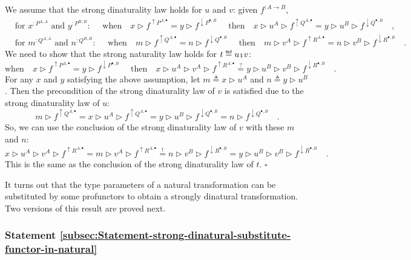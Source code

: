 We assume that the strong dinaturality law holds for $u$ and $v$:
given $f^{:A\rightarrow B}$,
\begin{align*}
 & \text{for }x^{:P^{A,A}}\text{ and }y^{:P^{B,B}}:\quad\text{ when}\quad x\triangleright f^{\uparrow P^{A,\bullet}}=y\triangleright f^{\downarrow P^{\bullet,B}}\quad\text{ then}\quad x\triangleright u^{A}\triangleright f^{\uparrow Q^{A,\bullet}}=y\triangleright u^{B}\triangleright f^{\downarrow Q^{\bullet,B}}\quad,\\
 & \text{for }m^{:Q^{A,A}}\text{ and }n^{:Q^{B,B}}:\quad\text{ when}\quad m\triangleright f^{\uparrow Q^{A,\bullet}}=n\triangleright f^{\downarrow Q^{\bullet,B}}\quad\text{ then}\quad m\triangleright v^{A}\triangleright f^{\uparrow R^{A,\bullet}}=n\triangleright v^{B}\triangleright f^{\downarrow R^{\bullet,B}}\quad.
\end{align*}
We need to show that the strong naturality law holds for $t\triangleq u\bef v$:
\[
\text{when}\quad x\triangleright f^{\uparrow P^{A,\bullet}}=y\triangleright f^{\downarrow P^{\bullet,B}}\quad\text{ then}\quad x\triangleright u^{A}\triangleright v^{A}\triangleright f^{\uparrow R^{A,\bullet}}\overset{?}{=}y\triangleright u^{B}\triangleright v^{B}\triangleright f^{\downarrow R^{\bullet,B}}\quad.
\]
For any $x$ and $y$ satisfying the above assumption, let $m\triangleq x\triangleright u^{A}$
and $n\triangleq y\triangleright u^{B}$. Then the precondition of
the strong dinaturality law of $v$ is satisfied due to the strong
dinaturality law of $u$:
\[
m\triangleright f^{\uparrow Q^{A,\bullet}}=x\triangleright u^{A}\triangleright f^{\uparrow Q^{A,\bullet}}=y\triangleright u^{B}\triangleright f^{\downarrow Q^{\bullet,B}}=n\triangleright f^{\downarrow Q^{\bullet,B}}\quad.
\]
So, we can use the conclusion of the strong dinaturality law of $v$
with these $m$ and $n$:
\[
x\triangleright u^{A}\triangleright v^{A}\triangleright f^{\uparrow R^{A,\bullet}}=m\triangleright v^{A}\triangleright f^{\uparrow R^{A,\bullet}}\overset{!}{=}n\triangleright v^{B}\triangleright f^{\downarrow R^{\bullet,B}}=y\triangleright u^{B}\triangleright v^{B}\triangleright f^{\downarrow R^{\bullet,B}}\quad.
\]
This is the same as the conclusion of the strong dinaturality law
of $t$. $\square$

It turns out that the type parameters of a natural transformation
can be substituted by some profunctors to obtain a strongly dinatural
transformation. Two versions of this result are proved next.

\subsubsection{Statement \label{subsec:Statement-strong-dinatural-substitute-functor-in-natural}\ref{subsec:Statement-strong-dinatural-substitute-functor-in-natural}}

